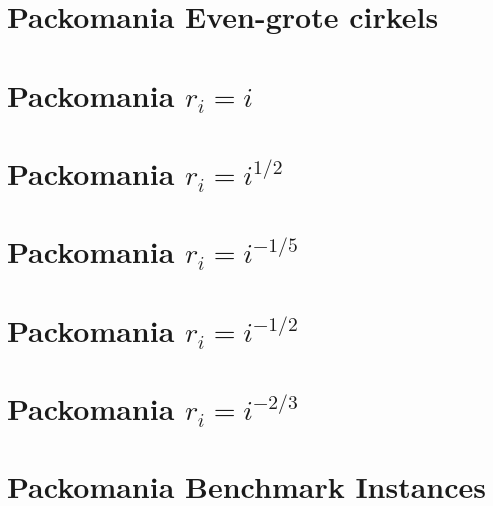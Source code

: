 \documentclass[12pt,a4paper,oneside]{book}
\begin{document}
\chapter{Packomania Even-grote cirkels}

 \label{append:packomania-equal}

\chapter{Packomania \ensuremath{r_i=i}}

 \label{table:packomania-1}

\chapter{Packomania \ensuremath{r_i=i^{1/2}}}


\chapter{Packomania \ensuremath{r_i=i^{-1/5}}}


\chapter{Packomania \ensuremath{r_i=i^{-1/2}}}


\chapter{Packomania \ensuremath{r_i=i^{-2/3}}}


\chapter{Packomania Benchmark Instances}

\end{document}
